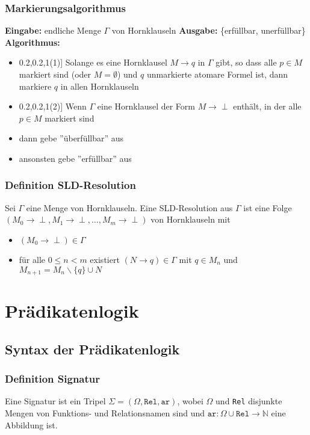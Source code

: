\documentclass[12pt,a4paper]{report}
\newcommand{\ra}{\rightarrow}
\newcommand{\red}[1]{\textcolor[rgb]{0.9,0.2,0.2}{#1}}
\newcommand{\blue}[1]{\textcolor[rgb]{0.2,0.2,1}{#1}}
\begin{document}
\subsection{\red{Markierungsalgorithmus}}
\textbf{Eingabe:} endliche Menge $ \Gamma $ von Hornklauseln\newline
\textbf{Ausgabe:} \{erfüllbar, unerfüllbar\}\newline
\textbf{Algorithmus:}
\begin{itemize}
    \item[\blue{(1)}] Solange es eine Hornklausel $ M \ra q $ in $ \Gamma $ gibt, so dass alle $ p \in M $ markiert sind (oder $ M = \emptyset $) und $ q $ unmarkierte atomare Formel ist, dann markiere $ q $ in allen Hornklauseln
    \item[\blue{(2)}] Wenn $ \Gamma $ eine Hornklausel der Form $ M \ra \perp $ enthält, in der alle $ p \in M $ markiert sind
    \item[->] dann gebe ''überfüllbar'' aus
    \item[->] ansonsten gebe ''erfüllbar'' aus
\end{itemize}
\subsection{\blue{Definition SLD-Resolution}}
Sei $ \Gamma $ eine Menge von Hornklauseln. Eine \red{SLD-Resolution aus $ \Gamma $} ist eine Folge $ (M_0 \ra \perp, M_1 \ra \perp,\dots,M_m \ra \perp) $ von Hornklauseln mit
\begin{itemize}
    \item $ (M_0 \ra \perp) \in \Gamma $
    \item für alle $ 0 \leq n < m $ existiert $ (N\ra q) \in \Gamma$ mit $ q \in M_n $ und $ M_{n+1} = M_n\backslash\{q\}\cup N$
\end{itemize}

\chapter{Prädikatenlogik}
\section{\blue{Syntax der Prädikatenlogik}}
\subsection{\blue{Definition Signatur}}
Eine \red{Signatur} ist ein Tripel $ \Sigma = (\Omega, \texttt{Rel}, \texttt{ar})$, wobei $ \Omega $ und \texttt{Rel} disjunkte Mengen von \red{Funktions- und Relationsnamen} sind und $ \texttt{ar}:\Omega \cup \texttt{Rel} \ra \mathbb{N} $ eine Abbildung ist.
\end{document}
